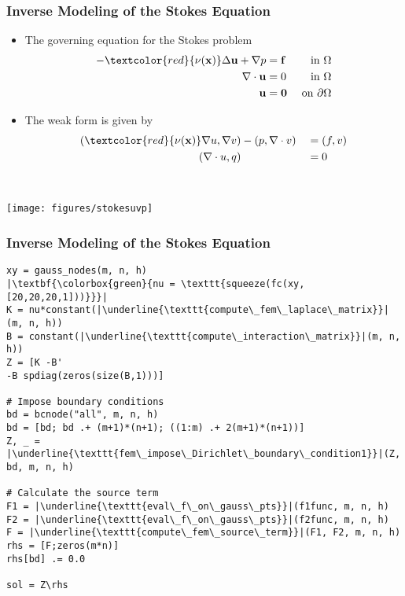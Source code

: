 \documentclass[usenames,dvipsnames]{beamer}
\begin{document}
\begin{frame}
	\frametitle{Inverse Modeling of the Stokes Equation}
	
	\begin{itemize}
		\item The governing equation for the Stokes problem
		$$\begin{aligned} -\textcolor{red}{\nu(\mathbf{x})}\Delta \mathbf{u} + \nabla p &= \mathbf{f} & \text{ in } \Omega \\ \nabla \cdot \mathbf{u} &= 0 & \text{ in } \Omega \\ \mathbf{u} &= \mathbf{0} & \text{ on } \partial \Omega \end{aligned}$$
	\end{itemize}
	
	
	\begin{minipage}[c]{0.7\textwidth}
		\begin{itemize}
			\item The weak form is given by 
			\begin{equation*}
			\begin{aligned}
			(\textcolor{red}{\nu(\mathbf{x})} \nabla u, \nabla v) &- (p, \nabla \cdot v) &&= (f, v)\\
			(\nabla \cdot u, q) & &&= 0
			\end{aligned}
			\end{equation*}
		\end{itemize}
	\end{minipage}~
	\begin{minipage}[c]{0.29\textwidth}
		\texttt{[image: figures/stokesuvp]}
	\end{minipage}
	
	
\end{frame}


\begin{frame}[fragile]{}
	\frametitle{Inverse Modeling of the Stokes Equation}
	
	\begin{verbatim}
xy = gauss_nodes(m, n, h)
|\textbf{\colorbox{green}{nu = \texttt{squeeze(fc(xy, [20,20,20,1]))}}}|
K = nu*constant(|\underline{\texttt{compute\_fem\_laplace\_matrix}}|(m, n, h))
B = constant(|\underline{\texttt{compute\_interaction\_matrix}}|(m, n, h))
Z = [K -B'
-B spdiag(zeros(size(B,1)))]

# Impose boundary conditions
bd = bcnode("all", m, n, h)
bd = [bd; bd .+ (m+1)*(n+1); ((1:m) .+ 2(m+1)*(n+1))]
Z, _ = |\underline{\texttt{fem\_impose\_Dirichlet\_boundary\_condition1}}|(Z, bd, m, n, h)

# Calculate the source term 
F1 = |\underline{\texttt{eval\_f\_on\_gauss\_pts}}|(f1func, m, n, h)
F2 = |\underline{\texttt{eval\_f\_on\_gauss\_pts}}|(f2func, m, n, h)
F = |\underline{\texttt{compute\_fem\_source\_term}}|(F1, F2, m, n, h)
rhs = [F;zeros(m*n)]
rhs[bd] .= 0.0

sol = Z\rhs 
	\end{verbatim}
	
	
\end{frame}
\end{document}
